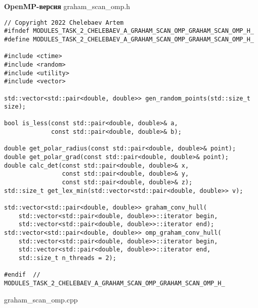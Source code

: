 \documentclass{report}
\begin{document}
\textbf{OpenMP-версия}
\newline
\newline graham\_scan\_omp.h
\begin{lstlisting}
// Copyright 2022 Chelebaev Artem
#ifndef MODULES_TASK_2_CHELEBAEV_A_GRAHAM_SCAN_OMP_GRAHAM_SCAN_OMP_H_
#define MODULES_TASK_2_CHELEBAEV_A_GRAHAM_SCAN_OMP_GRAHAM_SCAN_OMP_H_

#include <ctime>
#include <random>
#include <utility>
#include <vector>

std::vector<std::pair<double, double>> gen_random_points(std::size_t size);

bool is_less(const std::pair<double, double>& a,
             const std::pair<double, double>& b);

double get_polar_radius(const std::pair<double, double>& point);
double get_polar_grad(const std::pair<double, double>& point);
double calc_det(const std::pair<double, double>& x,
                const std::pair<double, double>& y,
                const std::pair<double, double>& z);
std::size_t get_lex_min(std::vector<std::pair<double, double>> v);

std::vector<std::pair<double, double>> graham_conv_hull(
    std::vector<std::pair<double, double>>::iterator begin,
    std::vector<std::pair<double, double>>::iterator end);
std::vector<std::pair<double, double>> omp_graham_conv_hull(
    std::vector<std::pair<double, double>>::iterator begin,
    std::vector<std::pair<double, double>>::iterator end,
    std::size_t n_threads = 2);

#endif  // MODULES_TASK_2_CHELEBAEV_A_GRAHAM_SCAN_OMP_GRAHAM_SCAN_OMP_H_

\end{lstlisting}
graham\_scan\_omp.cpp
\end{document}
